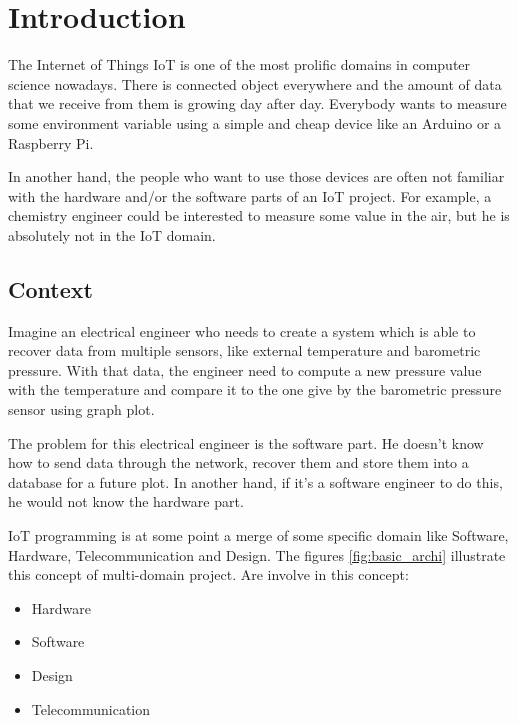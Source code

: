 \chapter{Introduction}
\label{cha:introduction}

The Internet of Things \gls{IoT} is one of the most prolific domains in computer science
nowadays. There is connected object everywhere and the amount of data that we
receive from them is growing day after day. Everybody wants to measure some
environment variable using a simple and cheap device like an Arduino or a
Raspberry Pi.

In another hand, the people who want to use those devices are often not familiar
with the hardware and/or the software parts of an IoT project. For example, a
chemistry engineer could be interested to measure some value in the air, but he
is absolutely not in the IoT domain.

\section{Context}
\label{sec:intro-context}

Imagine an electrical engineer who needs to create a system which is able to
recover data from multiple sensors, like external temperature and barometric
pressure. With that data, the engineer need to compute a new pressure value
with the temperature and compare it to the one give by the barometric pressure
sensor using graph plot.

The problem for this electrical engineer is the software part. He doesn’t know how
to send data through the network, recover them and store them into a database
for a future plot. In another hand, if it’s a software engineer to do this, he
would not know the hardware part.

IoT programming is at some point a merge of some specific domain like Software,
Hardware, Telecommunication and Design. The figures \ref{fig:basic_archi} illustrate
this concept of multi-domain project. Are involve in this concept:

\begin{itemize}
\item Hardware
\item Software
\item Design
\item Telecommunication
\end{itemize}

